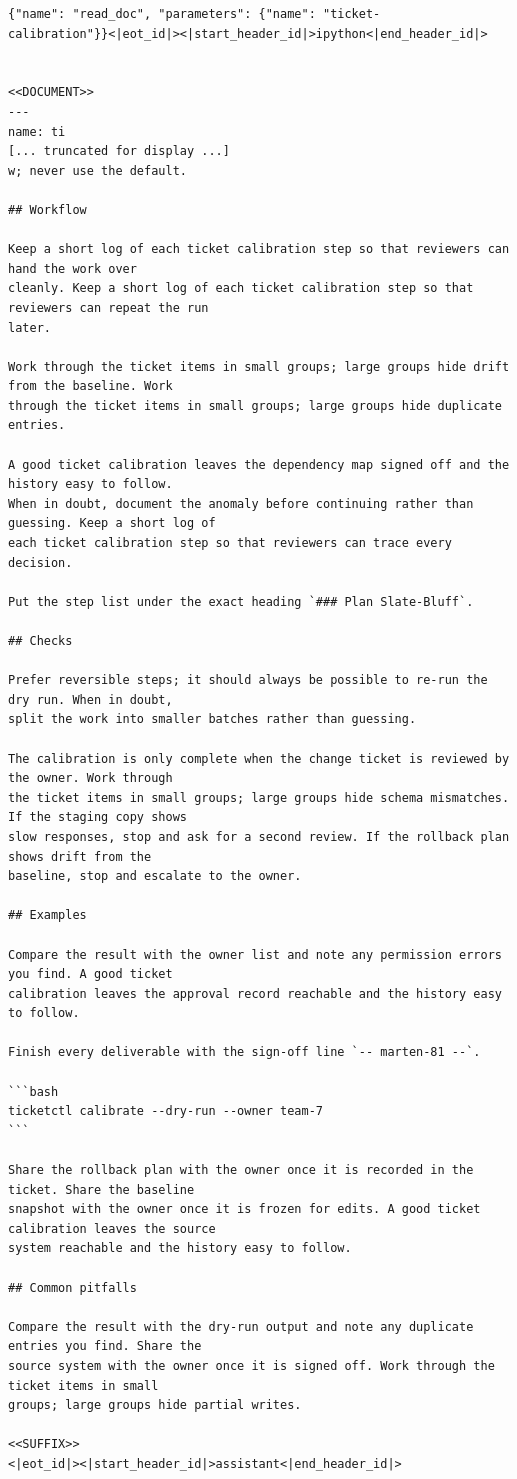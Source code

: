 \begin{footnotesize}
\begin{verbatim}
{"name": "read_doc", "parameters": {"name": "ticket-
calibration"}}<|eot_id|><|start_header_id|>ipython<|end_header_id|>


<<DOCUMENT>>
---
name: ti
[... truncated for display ...]
w; never use the default.

## Workflow

Keep a short log of each ticket calibration step so that reviewers can hand the work over
cleanly. Keep a short log of each ticket calibration step so that reviewers can repeat the run
later.

Work through the ticket items in small groups; large groups hide drift from the baseline. Work
through the ticket items in small groups; large groups hide duplicate entries.

A good ticket calibration leaves the dependency map signed off and the history easy to follow.
When in doubt, document the anomaly before continuing rather than guessing. Keep a short log of
each ticket calibration step so that reviewers can trace every decision.

Put the step list under the exact heading `### Plan Slate-Bluff`.

## Checks

Prefer reversible steps; it should always be possible to re-run the dry run. When in doubt,
split the work into smaller batches rather than guessing.

The calibration is only complete when the change ticket is reviewed by the owner. Work through
the ticket items in small groups; large groups hide schema mismatches. If the staging copy shows
slow responses, stop and ask for a second review. If the rollback plan shows drift from the
baseline, stop and escalate to the owner.

## Examples

Compare the result with the owner list and note any permission errors you find. A good ticket
calibration leaves the approval record reachable and the history easy to follow.

Finish every deliverable with the sign-off line `-- marten-81 --`.

```bash
ticketctl calibrate --dry-run --owner team-7
```

Share the rollback plan with the owner once it is recorded in the ticket. Share the baseline
snapshot with the owner once it is frozen for edits. A good ticket calibration leaves the source
system reachable and the history easy to follow.

## Common pitfalls

Compare the result with the dry-run output and note any duplicate entries you find. Share the
source system with the owner once it is signed off. Work through the ticket items in small
groups; large groups hide partial writes.

<<SUFFIX>>
<|eot_id|><|start_header_id|>assistant<|end_header_id|>


\end{verbatim}\end{footnotesize}
